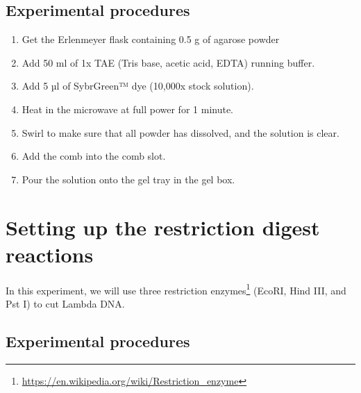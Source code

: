 \documentclass[]{book}
\providecommand{\tightlist}{%
  \setlength{\itemsep}{0pt}\setlength{\parskip}{0pt}}
\let\rmarkdownfootnote\footnote%
\def\footnote{\protect\rmarkdownfootnote}
\renewcommand{\href}[2]{#2\footnote{\url{#1}}}
\begin{document}
\hypertarget{experimental-procedures-32}{%
\subsection{Experimental procedures}\label{experimental-procedures-32}}

\begin{enumerate}
\def\labelenumi{\arabic{enumi}.}
\setcounter{enumi}{1}
\tightlist
\item
  Get the Erlenmeyer flask containing 0.5 g of agarose powder
\item
  Add 50 ml of 1x TAE (Tris base, acetic acid, EDTA) running buffer.
\item
  Add 5 µl of SybrGreen™ dye (10,000x stock solution).
\item
  Heat in the microwave at full power for 1 minute.
\item
  Swirl to make sure that all powder has dissolved, and the solution is clear.
\item
  Add the comb into the comb slot.
\item
  Pour the solution onto the gel tray in the gel box.
\end{enumerate}

\hypertarget{setting-up-the-restriction-digest-reactions}{%
\section{Setting up the restriction digest reactions}\label{setting-up-the-restriction-digest-reactions}}

In this experiment, we will use three \href{https://en.wikipedia.org/wiki/Restriction_enzyme}{restriction enzymes} (EcoRI, Hind III, and Pst I) to cut Lambda DNA.

\hypertarget{experimental-procedures-33}{%
\subsection{Experimental procedures}\label{experimental-procedures-33}}
\end{document}
